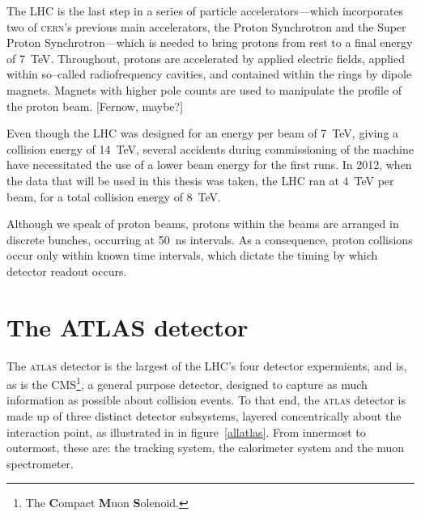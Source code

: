 The LHC is the last step in a series of particle accelerators---which incorporates two of \textsc{cern}'s previous main accelerators, the Proton Synchrotron and the Super Proton Synchrotron---which is needed to bring protons from rest to a final energy of 7~TeV. Throughout, protons are accelerated by applied electric fields, applied within so--called radiofrequency cavities, and contained within the rings by dipole magnets. Magnets with higher pole counts are used to manipulate the profile of the proton beam. [Fernow, maybe?]

Even though the LHC was designed for an energy per beam of 7~TeV, giving a collision energy of 14~TeV, several accidents during commissioning of the machine have necessitated the use of a lower beam energy for the first runs. In 2012, when the data that will be used in this thesis was taken, the LHC ran at 4~TeV per beam, for a total collision energy of 8~TeV.

Although we speak of proton beams, protons within the beams are arranged in discrete bunches, occurring at 50~ns intervals. As a consequence, proton collisions occur only within known time intervals, which dictate the timing by which detector readout occurs.

\section{The ATLAS detector}
The \textsc{atlas} detector is the largest of the LHC's four detector expermients, and is, as is the CMS\footnote{The \textbf{C}ompact \textbf{M}uon \textbf{S}olenoid.}, a general purpose detector, designed to capture as much information as possible about collision events. To that end, the \textsc{atlas} detector is made up of three distinct detector subsystems, layered concentrically about the interaction point, as illustrated in in figure~\ref{allatlas}. From innermost to outermost, these are: the tracking system, the calorimeter system and the muon spectrometer.

